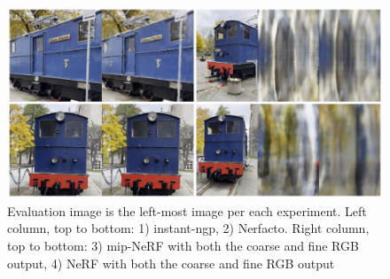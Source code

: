 \begin{figure}[h]
    \centering
    \includegraphics[width=1.0\textwidth]{figures/ohma-electra-result.png}
    \caption{Evaluation image is the left-most image per each experiment.
    Left column, top to bottom: 1) instant-ngp, 2) Nerfacto. Right column, top to bottom: 3) mip-NeRF with both the coarse and fine RGB output, 4) NeRF with both the coarse and fine RGB output}
    \label{fig:ohma-electra-result}
\end{figure}